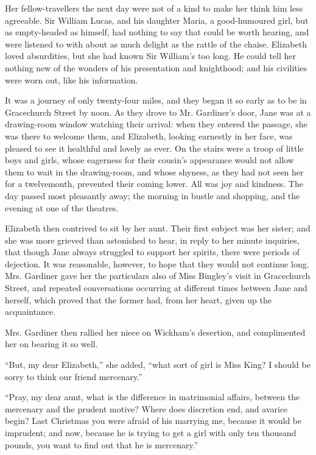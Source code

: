 \documentclass[12pt]{book}
\begin{document}
Her fellow-travellers the next day were not of a kind to make her think him less agreeable. Sir William Lucas, and his daughter Maria, a good-humoured girl, but as empty-headed as himself, had nothing to say that could be worth hearing, and were listened to with about as much delight as the rattle of the chaise. Elizabeth loved absurdities, but she had known Sir William's too long. He could tell her nothing new of the wonders of his presentation and knighthood; and his civilities were worn out, like his information.

It was a journey of only twenty-four miles, and they began it so early as to be in Gracechurch Street by noon. As they drove to Mr. Gardiner's door, Jane was at a drawing-room window watching their arrival: when they entered the passage, she was there to welcome them, and Elizabeth, looking earnestly in her face, was pleased to see it healthful and lovely as ever. On the stairs were a troop of little boys and girls, whose eagerness for their cousin's appearance would not allow them to wait in the drawing-room, and whose shyness, as they had not seen her for a twelvemonth, prevented their coming lower. All was joy and kindness. The day passed most pleasantly away; the morning in bustle and shopping, and the evening at one of the theatres.

Elizabeth then contrived to sit by her aunt. Their first subject was her sister; and she was more grieved than astonished to hear, in reply to her minute inquiries, that though Jane always struggled to support her spirits, there were periods of dejection. It was reasonable, however, to hope that they would not continue long. Mrs. Gardiner gave her the particulars also of Miss Bingley's visit in Gracechurch Street, and repeated conversations occurring at different times between Jane and herself, which proved that the former had, from her heart, given up the acquaintance.

Mrs. Gardiner then rallied her niece on Wickham's desertion, and complimented her on bearing it so well.

``But, my dear Elizabeth,'' she added, ``what sort of girl is Miss King? I should be sorry to think our friend mercenary.''

``Pray, my dear aunt, what is the difference in matrimonial affairs, between the mercenary and the prudent motive? Where does discretion end, and avarice begin? Last Christmas you were afraid of his marrying me, because it would be imprudent; and now, because he is trying to get a girl with only ten thousand pounds, you want to find out that he is mercenary.''
\end{document}
